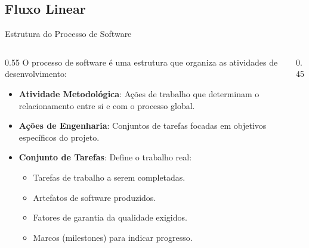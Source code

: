 \documentclass[9pt]{beamer}
\begin{document}
\subsection{Fluxo Linear}
\begin{frame}{Estrutura do Processo de Software}
  \begin{columns}
    \begin{column}{0.55\textwidth}
      \small
      O processo de software é uma estrutura que organiza as atividades de desenvolvimento:
      \vspace{0.2cm}
      \begin{itemize}
        \item \textbf{Atividade Metodológica}: Ações de trabalho que determinam o relacionamento entre si e com o processo global.
        \item \textbf{Ações de Engenharia}: Conjuntos de tarefas focadas em objetivos específicos do projeto.
        \item \textbf{Conjunto de Tarefas}: Define o trabalho real:
          \begin{itemize}
            \item Tarefas de trabalho a serem completadas.
            \item Artefatos de software produzidos.
            \item Fatores de garantia da qualidade exigidos.
            \item Marcos (milestones) para indicar progresso.
          \end{itemize}
      \end{itemize}
    \end{column}
    \begin{column}{0.45\textwidth}
      \centering
    \end{column}
  \end{columns}
\end{frame}
\end{document}
